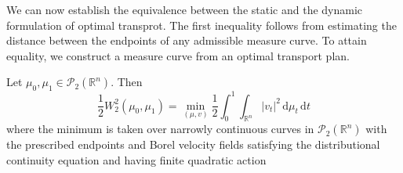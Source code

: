 We can now establish the equivalence between the static and the dynamic formulation of optimal transprot. The first inequality follows from estimating the distance between the endpoints of any admissible measure curve. To attain equality, we construct a measure curve from an optimal transport plan.
\begin{theorem}
	\label{thm:bb}
	Let $\mu_0,\mu_1\in\mathscr{P}_2(\mathbb{R}^n)$. Then
	\begin{equation*}
		\frac{1}{2}W_2^2(\mu_0,\mu_1)=\min_{(\mu,v)}\frac{1}{2}\int_0^1\int_{\mathbb{R}^n}|v_t|^2\,\mathrm d\mu_t\,\mathrm dt
	\end{equation*}
	where the minimum is taken over narrowly continuous curves in $\mathscr{P}_2(\mathbb{R}^n)$ with the prescribed endpoints and Borel velocity fields satisfying the distributional continuity equation and having finite quadratic action
\end{theorem}
